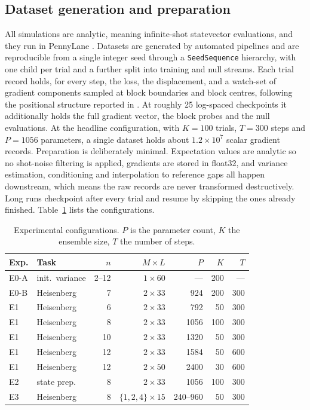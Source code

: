\documentclass[conference]{IEEEtran}%
\begin{document}
\subsection{Dataset generation and preparation}
All simulations are analytic, meaning infinite-shot statevector evaluations, and they run in PennyLane \cite{pennylane}. Datasets are generated by automated pipelines and are reproducible from a single integer seed through a \texttt{SeedSequence} hierarchy, with one child per trial and a further split into training and null streams. Each trial record holds, for every step, the loss, the displacement, and a watch-set of gradient components sampled at block boundaries and block centres, following the positional structure reported in \cite{grant}. At roughly 25 log-spaced checkpoints it additionally holds the full gradient vector, the block probes and the null evaluations. At the headline configuration, with $K{=}100$ trials, $T{=}300$ steps and $P{=}1056$ parameters, a single dataset holds about $1.2\times10^7$ scalar gradient records. Preparation is deliberately minimal. Expectation values are analytic so no shot-noise filtering is applied, gradients are stored in float32, and variance estimation, conditioning and interpolation to reference gaps all happen downstream, which means the raw records are never transformed destructively. Long runs checkpoint after every trial and resume by skipping the ones already finished. Table~\ref{tab:configs} lists the configurations.

\begin{table}[t]\centering\footnotesize
\caption{Experimental configurations. $P$ is the parameter count, $K$ the ensemble size, $T$ the number of steps.}
\label{tab:configs}
\begin{tabular}{@{}llrrrrr@{}}
\toprule
Exp. & Task & $n$ & $M{\times}L$ & $P$ & $K$ & $T$\\
\midrule
E0-A & init.\ variance & 2--12 & $1{\times}60$ & --- & 200 & --- \\
E0-B & Heisenberg & 7 & $2{\times}33$ & 924 & 200 & 300\\
E1 & Heisenberg & 6 & $2{\times}33$ & 792 & 50 & 300\\
E1 & Heisenberg & 8 & $2{\times}33$ & 1056 & 100 & 300\\
E1 & Heisenberg & 10 & $2{\times}33$ & 1320 & 50 & 300\\
E1 & Heisenberg & 12 & $2{\times}33$ & 1584 & 50 & 600\\
E1 & Heisenberg & 12 & $2{\times}50$ & 2400 & 30 & 600\\
E2 & state prep. & 8 & $2{\times}33$ & 1056 & 100 & 300\\
E3 & Heisenberg & 8 & $\{1,2,4\}{\times}15$ & 240--960 & 50 & 300\\
\bottomrule
\end{tabular}
\end{table}
\end{document}
